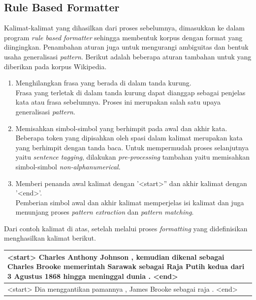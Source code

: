 \subsection{Rule Based Formatter}
Kalimat-kalimat yang dihasilkan dari proses sebelumnya, dimasukkan ke dalam program \textit{rule based formatter} sehingga membentuk korpus dengan format yang diingingkan. Penambahan aturan juga untuk mengurangi ambiguitas dan bentuk usaha generalisasi \textit{pattern}. Berikut adalah beberapa aturan tambahan untuk yang diberikan pada korpus Wikipedia.

\begin{enumerate}
  \item Menghilangkan frasa yang berada di dalam tanda kurung. \\
  Frasa yang terletak di dalam tanda kurung dapat dianggap sebagai penjelas kata atau frasa sebelumnya. Proses ini merupakan salah satu upaya generalisasi \textit{pattern}.
  \item Memisahkan simbol-simbol yang berhimpit pada awal dan akhir kata. \\
  Beberapa token yang dipisahkan oleh spasi dalam kalimat merupakan kata yang berhimpit dengan tanda baca. Untuk mempermudah proses selanjutnya yaitu \textit{sentence tagging}, dilakukan \textit{pre-processing} tambahan yaitu memisahkan simbol-simbol \textit{non-alphanumerical}.
  \item Memberi penanda awal kalimat dengan '<start>'' dan akhir kalimat dengan '<end>'. \\
  Pemberian simbol awal dan akhir kalimat memperjelas isi kalimat dan juga menunjang proses \textit{pattern extraction} dan \textit{pattern matching}.
\end{enumerate}

\noindent Dari contoh kalimat di atas, setelah melalui proses \textit{formatting} yang didefinisikan menghasilkan kalimat berikut.

\begin{center}
\begin{tabular}{ | m{32em} | } 
\hline
<start> Charles Anthony Johnson , kemudian dikenal sebagai Charles Brooke memerintah Sarawak sebagai Raja Putih kedua dari 3 Agustus 1868 hingga meninggal dunia . <end> \\
\hline 
<start> Dia menggantikan pamannya , James Brooke sebagai raja . <end> \\
\hline
\end{tabular}
\end{center}

